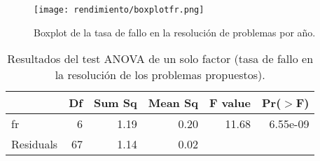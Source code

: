 \begin{figure}[H]
    \centering
    \texttt{[image: rendimiento/boxplotfr.png]}
    \caption{Boxplot de la tasa de fallo en la resolución de problemas por año.}
    \label{fig:boxplotfr}
\end{figure}

\begin{table}[H]
\centering
\caption{Resultados del test ANOVA de un solo factor (tasa de fallo en la resolución de los problemas propuestos).}
\label{tab:ANOVAfr}
\begin{tabular}{lrrrrr}
  \hline
 & Df & Sum Sq & Mean Sq & F value & Pr($>$F) \\ 
  \hline
fr & 6 & 1.19 & 0.20 & 11.68 & 6.55e-09 \\ 
  Residuals        & 67 & 1.14 & 0.02 &  &  \\ 
   \hline
\end{tabular}
\end{table}

